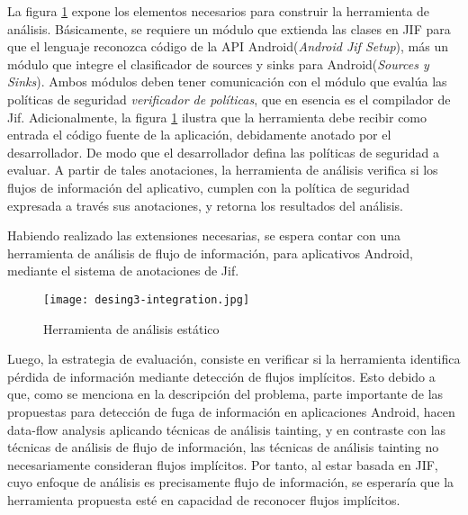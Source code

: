 La figura \ref{fig:desingInteger} expone los elementos necesarios para construir la
herramienta de análisis.
Básicamente, se requiere un módulo que extienda las clases en JIF para que el
lenguaje reconozca código de la API Android(\emph{Android Jif Setup}), más un
módulo que integre el clasificador de sources y sinks para Android(\emph{Sources
y Sinks}). 
Ambos módulos deben tener comunicación con el módulo que evalúa las
políticas de seguridad \emph{verificador de políticas}, que en esencia es el
compilador de Jif.\newline
Adicionalmente, la figura \ref{fig:desingInteger} ilustra que la herramienta
debe recibir como entrada el código fuente de la aplicación, debidamente
anotado por el desarrollador. De modo que el desarrollador defina las políticas
de seguridad a evaluar. A partir de tales anotaciones, la herramienta de
análisis verifica si los flujos de información del aplicativo, cumplen con la
política de seguridad expresada a través sus anotaciones, y retorna los
resultados del análisis.

Habiendo realizado las extensiones necesarias, se espera contar con una
herramienta de análisis de flujo de información, para aplicativos Android,
mediante el sistema de anotaciones de Jif.
\begin{figure}[t!]
	\begin{center}
	\texttt{[image: desing3-integration.jpg]} 
	\end{center}
	\caption{Herramienta de análisis estático  }
	\label{fig:desingInteger}
\end{figure}


Luego, la estrategia de evaluación, consiste en verificar si la herramienta
identifica pérdida de información mediante detección de flujos implícitos. Esto
debido a que, como se menciona en la descripción del problema, parte importante
de las propuestas para detección de fuga de información en aplicaciones Android,
hacen data-flow analysis aplicando técnicas de análisis tainting, y en contraste
con las técnicas de análisis de flujo de información, las técnicas de análisis
tainting no necesariamente consideran flujos implícitos. Por tanto, al estar
basada en JIF, cuyo enfoque de análisis es precisamente flujo de información, se
esperaría que la herramienta propuesta esté en capacidad de reconocer flujos
implícitos.

